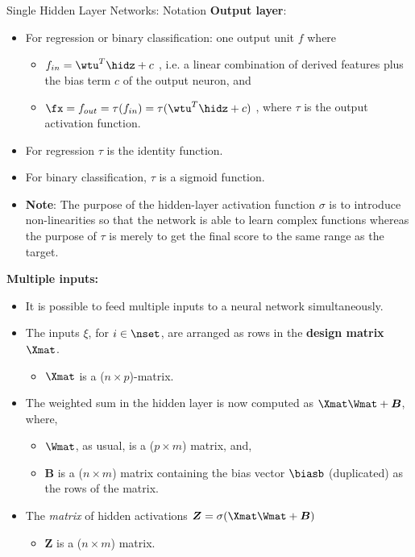 \begin{vbframe}{Single Hidden Layer Networks: Notation}
  \textbf{Output layer}:
  \begin{itemize}
    \vspace{4mm}
    \item For regression or binary classification: one output unit $f$ where
      \begin{itemize}
        \item $f_{in} = \wtu^T \hidz + c$ , i.e. a linear combination of derived features plus the bias term $c$ of the output neuron, and
        \vspace{2mm}
        \item $\fx= f_{out} = \tau(f_{in}) = \tau(\wtu^T \hidz + c)$ , where $\tau$ is the output activation function.
      \end{itemize}
    \item For regression $\tau$ is the identity function.
    \item For binary classification, $\tau$ is a sigmoid function.
    \item \textbf{Note}: The purpose of the hidden-layer activation function $\sigma$ is to introduce non-linearities so that the network is able to learn complex functions whereas the purpose of $\tau$ is merely to get the final score to the same range as the target.
  \end{itemize}

\framebreak 

  \textbf{%
  Multiple inputs:}
  \begin{itemize}
    \item It is possible to feed multiple inputs to a neural network simultaneously.
    \vspace{2mm}
    \item The inputs $\xi$, for $i \in \nset$, are arranged as rows in the \textbf{design matrix} $\Xmat$.
    \begin{itemize}
      \item $\Xmat$ is a ($n \times p$)-matrix.
    \end{itemize}
    \vspace{2mm}
    \item The weighted sum in the hidden layer is now computed as $\Xmat\Wmat + \bm{B}$, where,
      \begin{itemize}
        \item $\Wmat$, as usual, is a ($p \times m$) matrix, and,
        \vspace{2mm}
        \item $\bm{B}$ is a ($n \times m$) matrix containing the bias vector $\biasb$ (duplicated) as the rows of the matrix.
      \end{itemize}
    \vspace{2mm}
    \item The \textit{matrix} of hidden activations $\bm{Z} = \sigma(\Xmat\Wmat + \bm{B})$
    \begin{itemize}
      \item $\bm{Z}$ is a ($n \times m$) matrix.
    \end{itemize}
  \end{itemize}


\end{vbframe}
